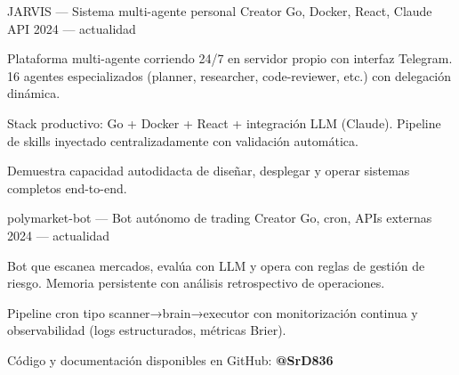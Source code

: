 \documentclass[10pt, a4paper]{awesome-cv}
\begin{document}
\begin{minipage}[t]{0.66\textwidth}
\begin{cventries}
\cventry
  { JARVIS — Sistema multi-agente personal }
  { Creator }
  { Go, Docker, React, Claude API }
  { 2024 — actualidad }
  {
\begin{cvitems}
    \item { Plataforma multi-agente corriendo 24/7 en servidor propio con interfaz Telegram. 16 agentes especializados (planner, researcher, code-reviewer, etc.) con delegación dinámica. }
    \item { Stack productivo: Go + Docker + React + integración LLM (Claude). Pipeline de skills inyectado centralizadamente con validación automática. }
    \item { Demuestra capacidad autodidacta de diseñar, desplegar y operar sistemas completos end-to-end. }
\end{cvitems}
  }
\cventry
  { polymarket-bot — Bot autónomo de trading }
  { Creator }
  { Go, cron, APIs externas }
  { 2024 — actualidad }
  {
\begin{cvitems}
    \item { Bot que escanea mercados, evalúa con LLM y opera con reglas de gestión de riesgo. Memoria persistente con análisis retrospectivo de operaciones. }
    \item { Pipeline cron tipo scanner→brain→executor con monitorización continua y observabilidad (logs estructurados, métricas Brier). }
\end{cvitems}
  }
\end{cventries}
\par\vspace{4pt}
{\small\color{graytext} Código y documentación disponibles en GitHub: \textbf{@SrD836}}


\end{minipage}
\end{document}
